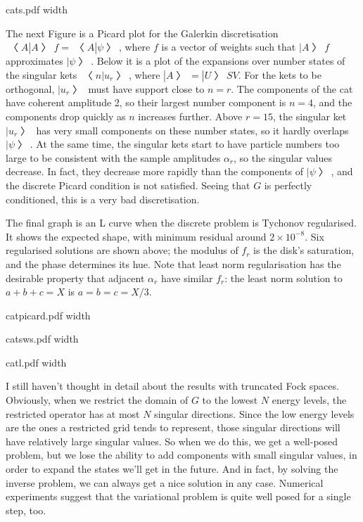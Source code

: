 \centerline{\XeTeXpicfile cats.pdf width \hsize}

The next Figure is a Picard plot for the Galerkin discretisation $〈A|A〉f=〈A|ψ〉$, where $f$ is a vector of weights such that $|A〉f$ approximates $|ψ〉$.  Below it is a plot of the expansions over number states of the singular kets $〈n|u_r〉$, where $|A〉=|U〉SV$.  For the kets to be orthogonal, $|u_r〉$ must have support close to $n=r$.  The components of the cat have coherent amplitude 2, so their largest number component is $n=4$, and the components drop quickly as $n$ increases further.  Above $r=15$, the singular ket $|u_r〉$ has very small components on these number states, so it hardly overlaps $|ψ〉$.  At the same time, the singular kets start to have particle numbers too large to be consistent with the sample amplitudes $α_r$, so the singular values decrease.  In fact, they decrease more rapidly than the components of $|ψ〉$, and the discrete Picard condition is not satisfied.  Seeing that $G$ is perfectly conditioned, this is a very bad discretisation.

The final graph is an L curve when the discrete problem is Tychonov regularised.  It shows the expected shape, with minimum residual around $2×10^{-8}$.  Six regularised solutions are shown above; the modulus of $f_r$ is the disk's saturation, and the phase determines its hue.  Note that least norm regularisation has the desirable property that adjacent $α_r$ have similar $f_r$: the least norm solution to $a+b+c=X$ is $a=b=c=X/3$.

\centerline{\XeTeXpicfile catpicard.pdf width \hsize}

\centerline{\XeTeXpicfile catsws.pdf width \hsize}

\centerline{\XeTeXpicfile catl.pdf width \hsize}


I still haven't thought in detail about the results with truncated Fock spaces.  Obviously, when we restrict the domain of $G$ to the lowest $N$ energy levels, the restricted operator has at most $N$ singular directions.  Since the low energy levels are the ones a restricted grid tends to represent, those singular directions will have relatively large singular values.  So when we do this, we get a well-posed problem, but we lose the ability to add components with small singular values, in order to expand the states we'll get in the future.  And in fact, by solving the inverse problem, we can always get a nice solution in any case.  Numerical experiments suggest that the variational problem is quite well posed for a single step, too.

